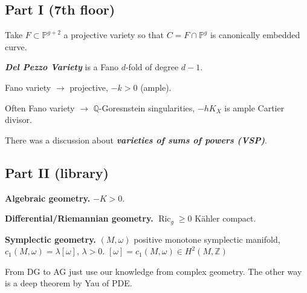 \subsection{Part I (7th floor)}

Take $F\subset \mathbb{P}^{g+2}$ a projective variety so that $C=F \cap\mathbb{P}^g$ is  canonically embedded curve.

\begin{defn}\leavevmode
	\textit{\textbf{Del Pezzo Variety}} is a Fano $d$-fold of degree $d-1$.
\end{defn}

\begin{defn}\leavevmode
	Fano variety $\to $ projective, $-k>0$ (ample).
\end{defn}

\begin{remark}\leavevmode
	Often Fano variety $\to$ $\mathbb{Q}$-Goresnstein singularities, $-h K_X$ is ample Cartier divisor.
\end{remark}
\iffalse
\begin{question}\leavevmode
	What is the relationship between Fano varieties and positive curvature?
\end{question}\fi

There was a discussion about \textit{\textbf{varieties of sums of powers (VSP)}}.
\iffalse which are
 \begin{align*}
\operatorname{ V SP}(f_d,k)&=\left\{ \ell_1,\ldots,\ell_p \in \mathbb{P}( V^*):\exists \alpha_1,\ldots,\alpha_k \in \mathbb{C},\;  \right\} 
\end{align*}
\fi

\subsection{Part II (library)}

{\bfseries Algebraic geometry.}\hspace{.5em} $-K>0$.

 {\bfseries Differential/Riemannian geometry.}\hspace{.5em} $\operatorname{Ric}_g \geq 0$ Kähler compact.

 {\bfseries Symplectic geometry.}\hspace{.5em} $(M,\omega)$ positive monotone symplectic manifold, $c_1(M,\omega)=\lambda[\omega]$, $\lambda>0$. $[\omega] = c_1(M,\omega)\in H^{2}(M, \mathbb{Z})$

From DG to AG just use our knowledge from complex geometry. The other way is a deep theorem by Yau of PDE.

